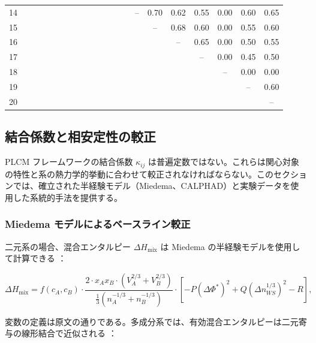 \documentclass[11pt,a4paper]{article}
\theoremstyle{remark}
\begin{document}
{\begin{longtable}{c|*{20}{c}}
			14 &   &   &   &   &   &   &   &   &   &   &   &   &   & – & 0.70 & 0.62 & 0.55 & 0.00 & 0.60 & 0.65 \\
			15 &   &   &   &   &   &   &   &   &   &   &   &   &   &   & – & 0.68 & 0.60 & 0.00 & 0.55 & 0.60 \\
			16 &   &   &   &   &   &   &   &   &   &   &   &   &   &   &   & – & 0.65 & 0.00 & 0.50 & 0.55 \\
			17 &   &   &   &   &   &   &   &   &   &   &   &   &   &   &   &   & – & 0.00 & 0.45 & 0.50 \\
			18 &   &   &   &   &   &   &   &   &   &   &   &   &   &   &   &   &   & – & 0.00 & 0.00 \\
			19 &   &   &   &   &   &   &   &   &   &   &   &   &   &   &   &   &   &   & – & 0.60 \\
			20 &   &   &   &   &   &   &   &   &   &   &   &   &   &   &   &   &   &   &   & – \\
			\bottomrule
	\end{longtable}}
	
	\subsection{結合係数と相安定性の較正}
	\label{subsec:calibration}
	
	PLCM フレームワークの結合係数 \(\kappa_{ij}\) は普遍定数ではない。これらは関心対象の特性と系の熱力学的挙動に合わせて較正されなければならない。このセクションでは、確立された半経験モデル（Miedema、CALPHAD）と実験データを使用した系統的手法を提供する。
	
	\subsubsection{Miedema モデルによるベースライン較正}
	
	二元系の場合、混合エンタルピー \(\Delta H_{\text{mix}}\) は Miedema の半経験モデルを使用して計算できる \cite{Miedema1980, Takeuchi2010}：
	
	\begin{equation}
		\Delta H_{\text{mix}} = f(c_A, c_B) \cdot \frac{2 \cdot x_A x_B \cdot (V_A^{2/3} + V_B^{2/3})}{\frac{1}{3}(n_A^{-1/3} + n_B^{-1/3})}
		\cdot \left[ -P (\Delta \Phi^*)^2 + Q (\Delta n_{WS}^{1/3})^2 - R \right],
		\label{eq:miedema}
	\end{equation}
	
	変数の定義は原文の通りである。多成分系では、有効混合エンタルピーは二元寄与の線形結合で近似される \cite{Takeuchi2010}：
	
\end{document}
